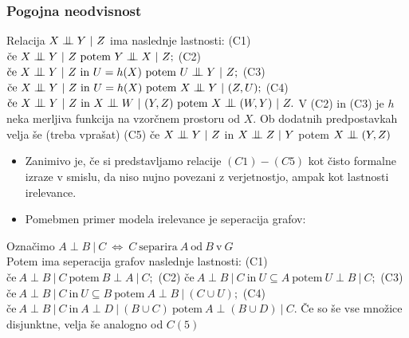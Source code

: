 \documentclass{beamer}
\newcommand{\cond}{\mathrel{\text{\scalebox{1.07}{$\perp\mkern-10mu\perp$}}}}
\begin{document}
\begin{frame}
    \frametitle{Pogojna neodvisnost}
        Relacija $ X \cond Y ~|~ Z$ ima naslednje lastnosti: \newline \newline
        (C1) $\text{če} ~X \cond Y ~|~ Z~ \text{potem}~ Y \cond X ~|~ Z;$\newline \newline
        (C2) $\text{če} ~X \cond Y ~|~ Z~ \text{in} ~U = h(X) ~\text{potem}~ U \cond Y ~|~ Z;$\newline \newline
        (C3) $\text{če} ~X \cond Y ~|~ Z~ \text{in} ~U = h(X) ~\text{potem}~ X \cond Y ~|~ (Z,U);$\newline \newline
        (C4) $\text{če} ~X \cond Y ~|~ Z~ \text{in} ~X \cond W ~|~ (Y,Z) ~\text{potem}~ X \cond (W,Y) ~|~ Z.$\newline \newline
        V (C2) in (C3) je $h$ neka merljiva funkcija na vzorčnem prostoru od $X$.
        Ob dodatnih predpostavkah velja še (treba vprašat) \newline \newline
        (C5) če $ X \cond Y ~|~ Z$ in $ X \cond Z ~|~ Y$ potem $ X \cond (Y,Z)$ 
\end{frame}
\begin{frame}
    \begin{itemize}
        \item Zanimivo je, če si predstavljamo relacije $(C1)-(C5)$ kot čisto formalne izraze
        v smislu, da niso nujno povezani z verjetnostjo, ampak kot lastnosti irelevance.
        \item Pomebmen primer modela irelevance je seperacija grafov:
    \end{itemize}
    Označimo $A \perp B ~|~ C ~ \Longleftrightarrow ~ C ~\text{separira}~ A~ \text{od} ~B~ \text{v}~ G$ \\
    Potem ima seperacija grafov naslednje lastnosti:\newline \newline
    (C1) $\text{če} ~A \perp B ~|~ C~ \text{potem}~ B \perp A ~|~ C;$\newline \newline
    (C2) $\text{če} ~A \perp B ~|~ C~ \text{in} ~U \subseteq A ~\text{potem}~ U \perp B ~|~ C;$\newline \newline
    (C3) $\text{če} ~A \perp B ~|~ C~ \text{in} ~U \subseteq B ~\text{potem}~ A \perp B ~|~ (C \cup U);$\newline \newline
    (C4) $\text{če} ~A \perp B ~|~ C~ \text{in} ~A \perp D ~|~ (B \cup C) ~\text{potem}~ A \perp (B \cup D) ~|~ C.$\newline \newline
    Če so še vse množice disjunktne, velja še analogno od $C(5)$ 
\end{frame}
\end{document}

